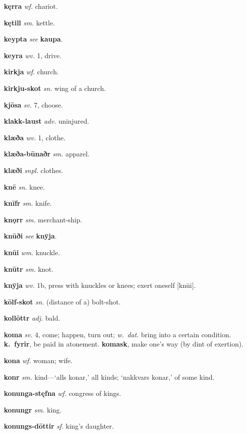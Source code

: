\documentclass[12pt,letterpaper]{book}
\begin{document}
\noindent
\textbf{kęrra} \textit{wf.} chariot.

\noindent
\textbf{kętill} \textit{sm.} kettle.

\noindent
\textbf{keypta} \textit{} \textit{see} \textbf{kaupa}.

\noindent
\textbf{keyra} \textit{wv.} 1, drive.

\noindent
\textbf{kirkja} \textit{wf.} church.

\noindent
\textbf{kirkju-skot} \textit{sn.} wing of a church.

\noindent
\textbf{kjōsa} \textit{sv.} 7, choose.

\noindent
\textbf{klakk-laust} \textit{adv.} uninjured.

\noindent
\textbf{klæða} \textit{wv.} 1, clothe.

\noindent
\textbf{klæða-būnaðr} \textit{sm.} apparel.

\noindent
\textbf{klæði} \textit{snpl.} clothes.

\noindent
\textbf{knē} \textit{sn.} knee.

\noindent
\textbf{knīfr} \textit{sm.} knife.

\noindent
\textbf{knǫrr} \textit{sm.} merchant-ship.

\noindent
\textbf{knūði} \textit{} \textit{see} \textbf{knȳja}.

\noindent
\textbf{knūi} \textit{wm.} knuckle.

\noindent
\textbf{knūtr} \textit{sm.} knot.

\noindent
\textbf{knȳja} \textit{wv.} 1b, press with knuckles or knees; exert
	oneself [knūi].

\noindent
\textbf{kōlf-skot} \textit{sn.} (distance of a) bolt-shot.

\noindent
\textbf{kollōttr} \textit{adj.} bald.

\noindent
\textbf{koma} \textit{sv.} 4, come; happen, turn out; \textit{w.\ dat.}
	bring into a certain condition.  \textbf{k.\ fyrir}, be paid in
	atonement.  \textbf{komask}, make one's way (by dint of exertion).

\noindent
\textbf{kona} \textit{wf.} woman; wife.

\noindent
\textbf{konr} \textit{sm.} kind---`alls konar,' all kinds; `nakkvars konar,'
	of some kind.

\noindent
\textbf{konunga-stęfna} \textit{wf.} congress of kings.

\noindent
\textbf{konungr} \textit{sm.} king.

\noindent
\textbf{konungs-dōttir} \textit{sf.} king's daughter.
\end{document}
